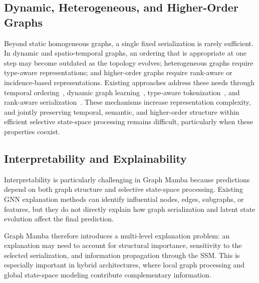 \documentclass[acmsmall]{acmart}
\begin{document}
\subsection{Dynamic, Heterogeneous, and Higher-Order Graphs}
\label{sec:ch-complex-graphs}

 
Beyond static homogeneous graphs, a single fixed serialization is rarely
sufficient. In dynamic and spatio-temporal graphs, an ordering that is
appropriate at one step may become outdated as the topology evolves;
heterogeneous graphs require type-aware representations; and higher-order
graphs require rank-aware or incidence-based representations. Existing
approaches address these needs through temporal
ordering~\cite{choi2024spot,li2024stg}, dynamic graph
learning~\cite{li2024state,yuan2025dg}, type-aware
tokenization~\cite{pan2024hetegraph}, and rank-aware
serialization~\cite{montagna2024topological,chen2026ccmamba}. These mechanisms
increase representation complexity, and jointly preserving temporal, semantic,
and higher-order structure within efficient selective state-space processing
remains difficult, particularly when these properties coexist.

\subsection{Interpretability and Explainability}
\label{sec:ch-interpretability}

 
Interpretability is particularly challenging in Graph Mamba because predictions
depend on both graph structure and selective state-space processing. Existing
GNN explanation methods can identify influential nodes, edges, subgraphs, or
features, but they do not directly explain how graph serialization and latent
state evolution affect the final prediction.

Graph Mamba therefore introduces a multi-level explanation problem: an
explanation may need to account for structural importance, sensitivity to the
selected serialization, and information propagation through the SSM. This is
especially important in hybrid architectures, where local graph processing and
global state-space modeling contribute complementary information.
\end{document}
